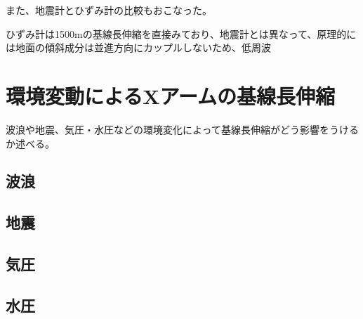 また、地震計とひずみ計の比較もおこなった。

ひずみ計は1500mの基線長伸縮を直接みており、地震計とは異なって、原理的には地面の傾斜成分は並進方向にカップルしないため、低周波


\section{環境変動によるXアームの基線長伸縮}
波浪や地震、気圧・水圧などの環境変化によって基線長伸縮がどう影響をうけるか述べる。

\subsection{波浪}
\subsection{地震}
\subsection{気圧}
\subsection{水圧}


